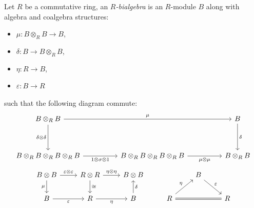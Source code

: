 \documentclass[8pt]{article}
\theoremstyle{definition}
\theoremstyle{definition}
\theoremstyle{definition}
\theoremstyle{definition}
\theoremstyle{definition}
\theoremstyle{definition}
\theoremstyle{definition}
\theoremstyle{definition}
\theoremstyle{definition}
\theoremstyle{definition}
\theoremstyle{definition}
\theoremstyle{definition}
\theoremstyle{definition}
\theoremstyle{definition}
\theoremstyle{question}
\begin{document}
Let $R$ be a commutative ring, an \emph{$R$-bialgebra} is an $R$-module $B$
along with algebra and coalgebra structures:
\begin{itemize}
  \item $\mu : B \otimes_R B \to B$,
  \item $\delta : B \to B \otimes_R B$,
  \item $\eta : R \to B$,
  \item $\varepsilon : B \to R$
\end{itemize}
such that the following diagram commute:
\[
\begin{tikzcd}
  B \otimes_R B \ar[dd, "\delta \otimes \delta"'] \ar[rrrr, "\mu"] &&&& B \ar[dd, "\delta"] \\
  \\
  B \otimes_R B \otimes_R B \otimes_R B \ar[rr, "1 \otimes \sigma \otimes 1"'] && B \otimes_R B \otimes_R B \otimes_R B \ar[rr, "\mu \otimes \mu"'] && B \otimes_R B
\end{tikzcd}
\]
\[
\begin{tikzcd}
  B \otimes B \ar[d, "\mu"'] \ar[r, "\varepsilon \otimes \varepsilon"] & R \otimes R \ar[d, "\cong"] \ar[r, "\eta \otimes \eta"] & B \otimes B && B \ar[dr, "\varepsilon"] \\
  B \ar[r, "\varepsilon"'] & R \ar[r, "\eta"'] & B \ar[u, "\delta"'] & R \ar[ur, "\eta"] \ar[rr, equal] && R
\end{tikzcd}
\]
\end{document}
